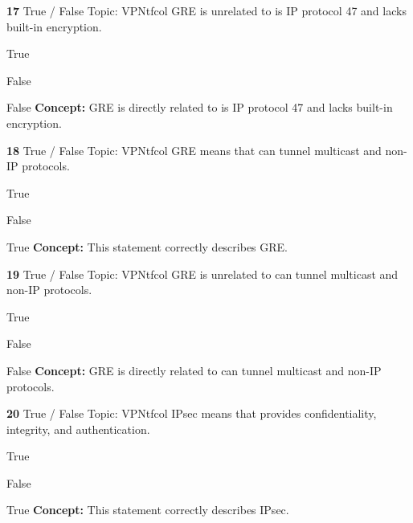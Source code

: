 \documentclass[10pt,a4paper]{article}
\begin{document}
\begin{qcard}{\color{white}\textbf{17} \hfill \small True / False \textbar{} Topic: VPN}{tfcol}
GRE is unrelated to is IP protocol 47 and lacks built-in encryption.

\begin{qoptions}
\item True
\item False
\end{qoptions}
\begin{explainbox}{False}
\textbf{Concept:} GRE is directly related to is IP protocol 47 and lacks built-in encryption.
\end{explainbox}
\end{qcard}

\begin{qcard}{\color{white}\textbf{18} \hfill \small True / False \textbar{} Topic: VPN}{tfcol}
GRE means that can tunnel multicast and non-IP protocols.

\begin{qoptions}
\item True
\item False
\end{qoptions}
\begin{explainbox}{True}
\textbf{Concept:} This statement correctly describes GRE.
\end{explainbox}
\end{qcard}

\begin{qcard}{\color{white}\textbf{19} \hfill \small True / False \textbar{} Topic: VPN}{tfcol}
GRE is unrelated to can tunnel multicast and non-IP protocols.

\begin{qoptions}
\item True
\item False
\end{qoptions}
\begin{explainbox}{False}
\textbf{Concept:} GRE is directly related to can tunnel multicast and non-IP protocols.
\end{explainbox}
\end{qcard}

\begin{qcard}{\color{white}\textbf{20} \hfill \small True / False \textbar{} Topic: VPN}{tfcol}
IPsec means that provides confidentiality, integrity, and authentication.

\begin{qoptions}
\item True
\item False
\end{qoptions}
\begin{explainbox}{True}
\textbf{Concept:} This statement correctly describes IPsec.
\end{explainbox}
\end{qcard}
\end{document}
